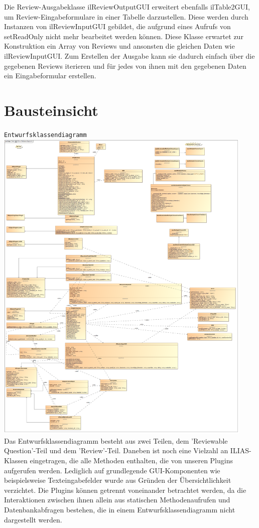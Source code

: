 \documentclass[a4paper]{scrreprt}
\begin{document}
Die Review-Ausgabeklasse ilReviewOutputGUI erweitert ebenfalls ilTable2GUI, um Review-Eingabeformulare in einer Tabelle darzustellen. Diese werden durch Instanzen von ilReviewInputGUI gebildet, die aufgrund eines Aufrufs von setReadOnly nicht mehr bearbeitet werden können. Diese Klasse erwartet zur Konstruktion ein Array von Reviews und ansonsten die gleichen Daten wie ilReviewInputGUI. Zum Erstellen der Ausgabe kann sie dadurch einfach über die gegebenen Reviews iterieren und für jedes von ihnen mit den gegebenen Daten ein Eingabeformular erstellen.\\
\chapter{Bausteinsicht}
\texttt{Entwurfsklassendiagramm}\\
\includegraphics[width=0.93\textwidth]{Class_Diagram__Entwurfsklassendiagramm.png}
\label{Entwurfsklassendiagramm}\\
Das Entwurfsklassendiagramm besteht aus zwei Teilen, dem 'Reviewable Question'-Teil und dem 'Review'-Teil. Daneben ist noch eine Vielzahl an ILIAS-Klassen eingetragen, die alle Methoden enthalten, die von unseren Plugins aufgerufen werden. Lediglich auf grundlegende GUI-Komponenten wie beispielsweise Texteingabefelder wurde aus Gründen der Übersichtlichkeit verzichtet. Die Plugins können getrennt voneinander betrachtet werden, da die Interaktionen zwischen ihnen allein aus statischen Methodenaufrufen und Datenbankabfragen bestehen, die in einem Entwurfsklassendiagramm nicht dargestellt werden.\\
\end{document}
